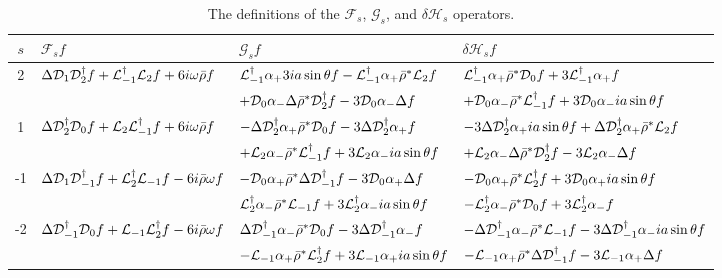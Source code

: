 \begin{refsection}
\begin{table}[h]
\begin{center}
    \begin{tabular}{ | c | p{2in} | p{2in} |  p{2in}|}
    \hline
    $s$ & $\mathcal{F}_s f$ & $\mathcal{G}_s f$ & $\delta\mathcal{H}_s f$ \\ \hline
  2 & $ \Delta \mathcal{D}_1\mathcal{D}_2^\dagger f +\mathcal{L}_{-1}^\dagger\mathcal{L}_2 f+6i\omega\bar\rho f$
 & $\mathcal{L}_{-1}^\dagger \alpha_+3ia\sin\theta f-\mathcal{L}_{-1}^\dagger \alpha_+\bar{\rho}^*\mathcal{L}_2 f$ & $\mathcal{L}_{-1}^\dagger\alpha_+\bar{\rho}^*\mathcal{D}_0f+3\mathcal{L}_{-1}^\dagger\alpha_+f $\\ & &$+\mathcal{D}_0\alpha_-\Delta\bar{\rho}^*\mathcal{D}_2^\dagger f-3\mathcal{D}_0\alpha_- \Delta f$ & $+\mathcal{D}_0\alpha_-\bar{\rho}^*\mathcal{L}_{-1}^\dagger f+3\mathcal{D}_0\alpha_-ia\sin\theta f$  \\ \hline
    1 & $ \Delta \mathcal{D}_2^\dagger\mathcal{D}_0 f +\mathcal{L}_{2}\mathcal{L}_{-1}^\dagger f+6i\omega\bar\rho f$ & $-\Delta\mathcal{D}_2^\dagger\alpha_+\bar{\rho}^*\mathcal{D}_0f-3\Delta\mathcal{D}_2^\dagger\alpha_+f$ & $-3\Delta\mathcal{D}_2^\dagger\alpha_+ia\sin\theta f+\Delta\mathcal{D}_2^\dagger\alpha_+\bar{\rho}^*\mathcal{L}_2f$ \\ & &$+\mathcal{L}_2\alpha_-\bar{\rho}^*\mathcal{L}_{-1}^\dagger f+3\mathcal{L}_2\alpha_-ia\sin\theta f$ & $+\mathcal{L}_2\alpha_-\Delta\bar{\rho}^*\mathcal{D}_2^\dagger f-3\mathcal{L}_2\alpha_-\Delta f $\\ \hline
    -1 & $\Delta\mathcal{D}_1\mathcal{D}_{-1}^\dagger f+\mathcal{L}_2^\dagger\mathcal{L}_{-1}f-6i\bar{\rho}\omega f$ & $- \mathcal{D}_0 \alpha_+ \bar{\rho}^* \Delta \mathcal{D}_{-1}^\dagger f -3 \mathcal{D}_0 \alpha_+ \Delta f$ & $-\mathcal{D}_0 \alpha_+ \bar{\rho}^* \mathcal{L}_2^\dagger f +3 \mathcal{D}_0 \alpha_+ ia \sin \theta f$ \\ & &$\mathcal{L}_2^\dagger \alpha_- \bar{\rho}^* \mathcal{L}_{-1} f +3 \mathcal{L}_2^\dagger \alpha_- i a\sin\theta f$ &$-\mathcal{L}_2^\dagger \alpha_- \bar{\rho}^* \mathcal{D}_0 f +3 \mathcal{L}_2^\dagger \alpha _- f$ \\ \hline
    -2 & $\Delta\mathcal{D}_{-1}^\dagger\mathcal{D}_0 f+\mathcal{L}_{-1}\mathcal{L}_2^\dagger f-6i\bar{\rho}\omega f$& $\Delta \mathcal{D}_{-1}^\dagger \alpha_-\bar{\rho}^*\mathcal{D}_0 f -3\Delta \mathcal{D}_{-1}^\dagger \alpha_- f$ & $-\Delta \mathcal{D}_{-1}^\dagger \alpha_- \bar{\rho}^* \mathcal{L}_{-1} f -3 \Delta \mathcal{D}_{-1}^\dagger \alpha_- i a \sin \theta f$ \\ &  &$- \mathcal{L}_{-1}\alpha_+ \bar{\rho}^* \mathcal{L}_2 ^\dagger f +3 \mathcal{L}_{-1} \alpha_+ i a \sin \theta f$ & $-\mathcal{L}_{-1} \alpha_+ \bar{\rho}^* \Delta \mathcal{D}_{-1}^\dagger f -3\mathcal{L}_{-1} \alpha_+ \Delta f$ \\ \hline
    \end{tabular} 
\end{center} 
\caption{The definitions of the $\mathcal{F}_s$, $\mathcal{G}_s$, and $\delta \mathcal{H}_s$ operators.}
\label{table}
\end{table}





\printbibliography[heading=subbibliography]
\end{refsection}